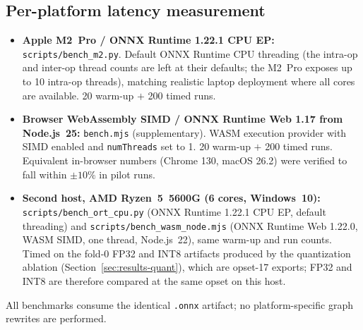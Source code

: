 \subsection{Per-platform latency measurement}
\label{sec:setup-latency}

\begin{itemize}
\item \textbf{Apple M2~Pro / ONNX Runtime 1.22.1 CPU EP:} \texttt{scripts/bench\_m2.py}. Default ONNX Runtime CPU threading (the intra-op and inter-op thread counts are left at their defaults; the M2~Pro exposes up to 10 intra-op threads), matching realistic laptop deployment where all cores are available. 20 warm-up $+$ 200 timed runs.
\item \textbf{Browser WebAssembly SIMD / ONNX Runtime Web 1.17 from Node.js~25:} \texttt{bench.mjs} (supplementary). WASM execution provider with SIMD enabled and \texttt{numThreads} set to 1. 20 warm-up $+$ 200 timed runs. Equivalent in-browser numbers (Chrome 130, macOS 26.2) were verified to fall within $\pm 10\%$ in pilot runs.
\item \textbf{Second host, AMD Ryzen~5~5600G (6 cores, Windows~10):} \texttt{scripts/bench\_ort\_cpu.py} (ONNX Runtime 1.22.1 CPU EP, default threading) and \texttt{scripts/bench\_wasm\_node.mjs} (ONNX Runtime Web 1.22.0, WASM SIMD, one thread, Node.js~22), same warm-up and run counts. Timed on the fold-0 FP32 and INT8 artifacts produced by the quantization ablation (Section~\ref{sec:results-quant}), which are opset-17 exports; FP32 and INT8 are therefore compared at the same opset on this host.
\end{itemize}

All benchmarks consume the identical \texttt{.onnx} artifact; no platform-specific graph rewrites are performed.
